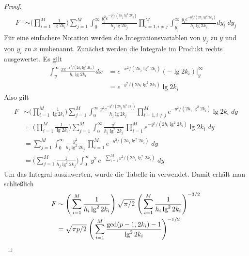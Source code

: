 \documentclass[a4paper, 11pt, ngerman]{article}
\theoremstyle{definition}
\theoremstyle{plain}
\theoremstyle{remark}
\begin{document}
\begin{proof}
    \begin{align*}
        F & \sim
        \Bigg (\prod_{i = 1}^M \frac 1 {\lg 2k_i} \Bigg )
        \sum_{j = 1}^M \int_0^\infty
        \frac {y_j^2 e^{-y_j^2 / (2h_j \lg^2 2k_j)}} {h_j \lg 2k_j}
        \prod_{i = 1, i \ne j}^M \int_{y_j}^{\infty}
        \frac {y_i e^{-y_i^2 / (2h_i \lg^2 2k_i)}} {h_i \lg 2k_i} dy_i \; dy_j
    \end{align*}
    Für eine einfachere Notation werden die Integrationsvariablen von $y_j$ zu $y$ und von $y_i$ zu $x$ umbenannt. Zunächst werden die Integrale im Produkt rechts ausgewertet. Es gilt
    \begin{align*}
        \int_{y}^{\infty}
        \frac {x e^{-x^2 / (2h_i \lg^2 2k_i)}} {h_i \lg 2k_i} dx
         & = e^{-x^2/(2h_i \lg^2 2k_i)} (- \lg 2k_i) \Big \vert_{y}^{\infty} \\
         & = e^{-y^2/(2h_i \lg^2 2k_i)} \lg 2k_i
    \end{align*}
    Also gilt
    \begin{align*}
        F & \sim
        \Bigg (\prod_{i = 1}^M \frac 1 {\lg 2k_i} \Bigg )
        \sum_{j = 1}^M \int_0^\infty
        \frac {y^2 e^{-y^2 / (2h_j \lg^2 2k_j)}} {h_j \lg 2k_j}
        \prod_{i = 1, i \ne j}^M e^{-y^2/(2h_i \lg^2 2k_i)} \lg 2k_i \; dy \\
          & = \Bigg ( \prod_{i = 1}^M \frac 1 {\lg 2k_i} \Bigg )
        \sum_{j = 1}^M \int_0^\infty
        \frac {y^2} {h_j \lg^2 2k_j} \,
        \prod_{i = 1}^M e^{-y^2/(2h_i \lg^2 2k_i)} \lg 2k_i \; dy          \\
          & = \sum_{j = 1}^M \int_0^\infty
        \frac {y^2} {h_j \lg^2 2k_j} \,
        \prod_{i = 1}^M e^{-y^2/(2h_i \lg^2 2k_i)} \; dy                   \\
          & = \Bigg ( \sum_{j = 1}^M \frac 1 {h_j \lg^2 2k_j} \Bigg )
        \int_0^\infty
        y^2 \,e^{- \sum_{i = 1}^M y^2/(2h_i \lg^2 2k_i)} \; dy
    \end{align*}
    Um das Integral auszuwerten, wurde die Tabelle in \cite{gint} verwendet. Damit erhält man schließlich
    \begin{align*}
        F & \sim \Bigg (\sum_{i = 1}^M \frac 1 {h_i \lg^2 2k_i} \Bigg ) \,
        \sqrt {\pi / 2} \
        \Bigg ( \sum_{i = 1}^M \frac 1 {h_i \lg^2 2k_i} \Bigg )^{-3/2}     \\
          & = \sqrt{\pi p / 2} \; \Bigg (
        \sum_{i = 1}^M \frac {\gcd(p - 1, 2k_i) - 1} {\lg^2 2k_i} \Bigg )^{-1/2} \qedhere
    \end{align*}
\end{proof}
\end{document}
